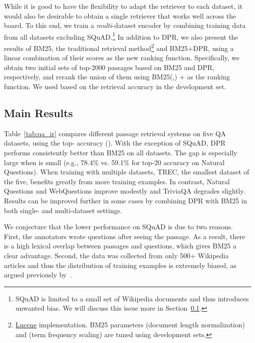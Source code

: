 \documentclass[11pt,a4paper]{article}
\def\model/{DPR}
\begin{document}
While it is good to have the flexibility to adapt the retriever to each dataset, it would also be desirable to obtain a single retriever that works well across the board. To this end, we train a \emph{multi}-dataset encoder by combining training data from all datasets excluding SQuAD.\footnote{SQuAD is limited to a small set of Wikipedia documents and thus introduces unwanted bias. We will discuss this issue more in Section~\ref{sec:retrieval_main_results}.} In addition to \model/, we also present the results of BM25, the traditional retrieval method\footnote{\href{https://lucene.apache.org/}{Lucene} implementation. BM25 parameters  (document length normalization) and  (term frequency scaling) are tuned using development sets.} and BM25+\model/, using a linear combination of their scores as the new ranking function. 
Specifically, we obtain two initial sets of top-2000 passages based on BM25 and DPR, respectively, and rerank the union of them using BM25(,) +  as the ranking function. We used  based on the retrieval accuracy in the development set.





\subsection{Main Results}
\label{sec:retrieval_main_results}

Table~\ref{tab:qa_ir} compares different passage retrieval systems on five QA datasets, using the top- accuracy ().
With the exception of SQuAD, \model/ performs consistently better than BM25 on all datasets.  The gap is especially large when  is small (e.g., 78.4\% vs. 59.1\% for top-20 accuracy on Natural Questions).
When training with multiple datasets, TREC, the smallest dataset of the five, benefits greatly from more training examples.  In contrast, Natural Questions and WebQuestions improve modestly and TriviaQA degrades slightly.
Results can be improved further in some cases by combining \model/ with BM25 in both single- and multi-dataset settings.

We conjecture that the lower performance on SQuAD is due to two reasons. First, the annotators wrote questions after seeing the passage.  As a result, there is a high lexical overlap between passages and questions, which gives BM25 a clear advantage.  Second, the data was collected from only 500+ Wikipedia articles and thus
the distribution of training examples is extremely biased, as argued previously by~.
\end{document}
